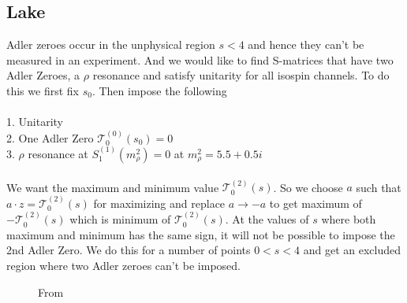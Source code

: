 ﻿\documentclass[12pt,a4paper]{article}
\begin{document}
\subsection{Lake}
Adler zeroes occur in the unphysical region $s<4$ and hence they can't be measured in an experiment. And we would like to find S-matrices that have two Adler Zeroes, a $\rho$ resonance and satisfy unitarity for all isospin channels. To do this we first fix $s_{0}$. Then impose the following\\\\
1. Unitarity\\
2. One Adler Zero $\mathcal{T}_{0}^{(0)}(s_{0})=0$\\
3. $\rho$ resonance at $S_{1}^{(1)}(m_{\rho}^{2})=0$ at $m_{\rho}^{2}=5.5+0.5i$\\\\
We want the maximum and minimum value $\mathcal{T}_{0}^{(2)}(s)$. So we choose $a$ such that $a\cdot z=\mathcal{T}_{0}^{(2)}(s)$ for maximizing and replace $a\rightarrow -a$ to get maximum of $-\mathcal{T}_{0}^{(2)}(s)$ which is minimum of $\mathcal{T}_{0}^{(2)}(s)$. At the values of $s$ where both maximum and minimum has the same sign, it will not be possible to impose the 2nd Adler Zero. We do this for a number of points $0<s<4$ and get an excluded region where two Adler zeroes can't be imposed.
\begin{figure}[H]
    \centering
    \qquad
    \caption{From \cite{2}}
    \label{fig:example}
\end{figure}
\end{document}
